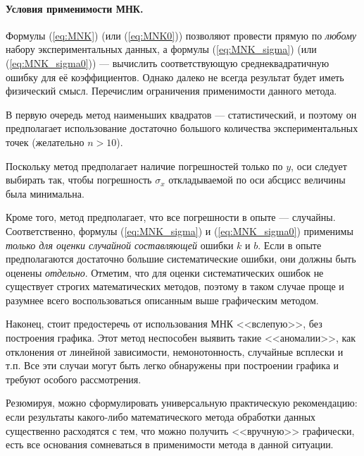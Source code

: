 \paragraph{Условия применимости МНК.}

Формулы (\ref{eq:MNK}) (или (\ref{eq:MNK0})) позволяют провести
прямую по \emph{любому} набору экспериментальных данных, а формулы
(\ref{eq:MNK_sigma}) (или (\ref{eq:MNK_sigma0})) --- вычислить
соответствующую среднеквадратичную ошибку для её коэффициентов. Однако
далеко не всегда результат будет иметь физический смысл. Перечислим
ограничения применимости данного метода.

В первую очередь метод наименьших квадратов --- статистический,
и поэтому он предполагает использование достаточно большого количества
экспериментальных точек (желательно $n>10$).

Поскольку метод предполагает наличие погрешностей только по $y$,
оси следует выбирать так, чтобы погрешность $\sigma_{x}$ откладываемой
по оси абсцисс величины была минимальна.

Кроме того, метод предполагает, что все погрешности в опыте ---
случайны. Соответственно, формулы (\ref{eq:MNK_sigma}) и (\ref{eq:MNK_sigma0})
применимы \emph{только для оценки случайной составляющей} ошибки $k$
и $b$. Если в опыте предполагаются достаточно большие систематические
ошибки, они должны быть оценены \emph{отдельно}. Отметим, что для
оценки систематических ошибок не существует строгих математических
методов, поэтому в таком случае проще и разумнее всего воспользоваться
описанным выше графическим методом.

Наконец, стоит предостеречь от использования МНК <<вслепую>>,
без построения графика. Этот метод неспособен выявить такие <<аномалии>>,
как отклонения от линейной зависимости, немонотонность, случайные
всплески и т.п. Все эти случаи могут быть легко обнаружены при построении
графика и требуют особого рассмотрения.

Резюмируя, можно сформулировать универсальную практическую рекомендацию:
если результаты какого-либо математического метода обработки данных
существенно расходятся с тем, что можно получить <<вручную>>
графически, есть все основания сомневаться в применимости метода в
данной ситуации.